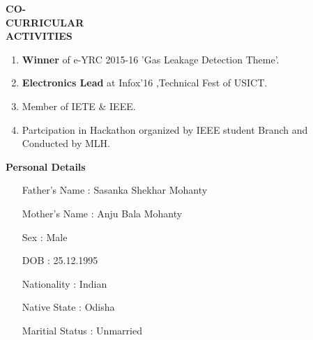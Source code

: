 \documentclass[11pt]{article}
\begin{document}
\begin{flushleft}
{\Large \bf{CO-\\CURRICULAR\\ ACTIVITIES}}
\begin{enumerate}
\addtolength{\itemindent}{1.55in}
\vspace{-0.70in} 
\item {\bf Winner} of e-YRC 2015-16 'Gas Leakage Detection Theme'.
\item {\bf Electronics Lead} at Infox'16 ,Technical Fest of USICT.
\item Member of IETE \& IEEE.
\item Partcipation in Hackathon organized by IEEE student Branch and \\ \hspace{1.68in}Conducted by MLH. 
\end{enumerate}
\end{flushleft}  

\begin{flushleft}
{\Large \bf{Personal Details}}
\begin{enumerate}
\addtolength{\itemindent}{2.2in}
\item[Father's Name : ] Sasanka Shekhar Mohanty	
\item[Mother's Name : ] Anju Bala Mohanty	
\item[Sex : ] Male	
\item[DOB : ] 25.12.1995	
\item[Nationality : ] Indian
\item[Native State : ] Odisha
\item[Maritial Status : ] Unmarried
\end{enumerate}
\end{flushleft}  
\end{document}
